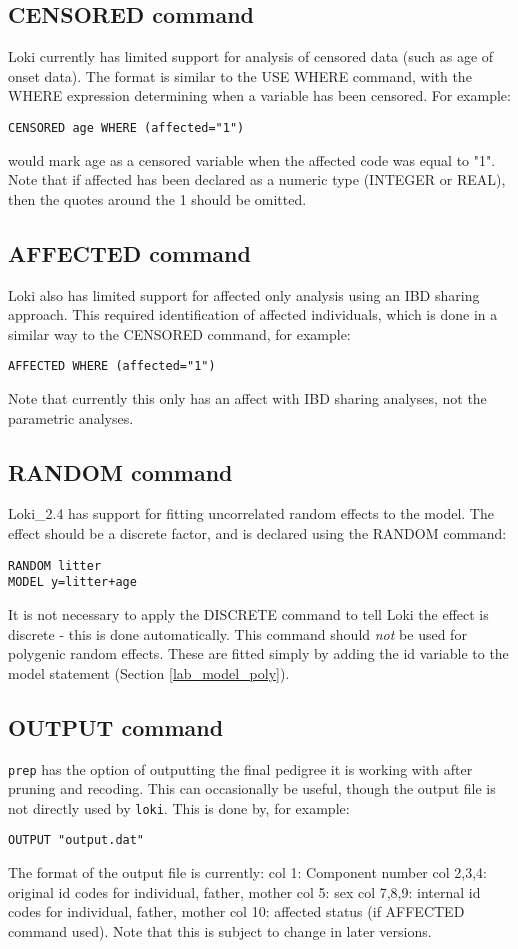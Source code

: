\documentclass[10pt,a4paper]{article}
\newcommand{\Prep}{\texttt{prep}\xspace}
\newcommand{\Loki}{\texttt{loki}\xspace}
\begin{document}
\subsection{CENSORED command}
Loki currently has limited support for analysis of censored data (such as age of
onset data).  The format is similar to the USE WHERE command, with the WHERE
expression determining when a variable has been censored.  For example:
\begin{verbatim}
CENSORED age WHERE (affected="1")
\end{verbatim}
would mark age as a censored variable when the affected code was equal to "1".
Note that if affected has been declared as a numeric type (INTEGER or REAL),
then the quotes around the 1 should be omitted.
\subsection{AFFECTED command}\label{aff1}
Loki also has limited support for affected only analysis using an IBD
sharing approach. This required identification of affected individuals,
which is done in a similar way to the CENSORED command, for example: 
\begin{verbatim}
AFFECTED WHERE (affected="1")
\end{verbatim}
Note that currently this only has an affect with IBD sharing analyses, not
the parametric analyses.
\subsection{RANDOM command}
Loki\_2.4 has support for fitting uncorrelated random effects to the model.  The effect
should be a discrete factor, and is declared using the RANDOM command:
\begin{verbatim}
RANDOM litter
MODEL y=litter+age
\end{verbatim}
It is not necessary to apply the DISCRETE command to tell Loki the effect is
discrete - this is done automatically.  This command should \emph{not} be
used for polygenic random effects.  These are fitted simply by adding the id
variable to the model statement (Section \ref{lab_model_poly}).
\subsection{OUTPUT command}
\Prep has the option of outputting the final pedigree it is working with
after pruning and recoding.  This can occasionally be useful, though the
output file is not directly used by \Loki.  This is done by, for example:
\begin{verbatim}
OUTPUT "output.dat"
\end{verbatim}
The format of the output file is currently:
col 1: Component number
col 2,3,4: original id codes for individual, father, mother
col 5: sex
col 7,8,9: internal id codes for individual, father, mother
col 10: affected status (if AFFECTED command used).
Note that this is subject to change in later versions.
\end{document}
